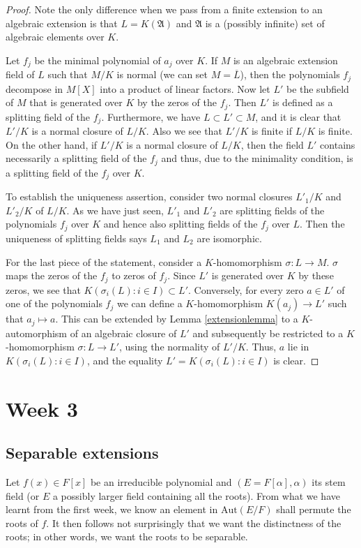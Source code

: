 \documentclass[12pt]{report}
\theoremstyle{definition}
\def\AA{\mathfrak{A}}
\def\Aut{\text{Aut}}
\def\aa{\alpha}
\begin{document}
\begin{proof} 
    Note the only difference when we pass from a finite extension to an algebraic extension is that $L=K(\AA)$ and $\AA$ is a (possibly infinite) set of algebraic elements over $K$.
    
    Let $f_j$ be the minimal polynomial of $a_j$ over $K$. If $M$ is an algebraic extension field of $L$ such that $M/K$ is normal (we can set $M=\overline{L}$), then the polynomials $f_j$ decompose in $M[X]$ into a product of linear factors. Now let $L'$ be the subfield of $M$ that is generated over $K$ by the zeros of the $f_j$. Then $L'$ is defined as a splitting field of the $f_j$. Furthermore, we have $L \subset L' \subset M$, and it is clear that $L'/K$ is a normal closure of $L/K$. Also we see that $L'/K$ is finite if $L/K$ is finite. On the other hand, if $L'/K$ is a normal closure of $L/K$, then the field $L'$ contains necessarily a splitting field of the $f_j$ and thus, due to the minimality condition, is a splitting field of the $f_j$ over $K$.


    To establish the uniqueness assertion, consider two normal closures $L'_1/K$ and $L'_2/K$ of $L/K$. As we have just seen, $L'_1$ and $L'_2$ are splitting fields of the polynomials $f_j$ over $K$ and hence also splitting fields of the $f_j$ over $L$. Then the uniqueness of splitting fields says $L_1$ and $L_2$ are isomorphic.


    For the last piece of the statement, consider a $K$-homomorphism $\sigma : L \to M$. $\sigma$ maps the zeros of the $f_j$ to zeros of $f_j$. Since $L'$ is generated over $K$ by these zeros, we see that $K(\sigma_i(L): i \in I) \subset L'$. Conversely, for every zero $a \in L'$ of one of the polynomials $f_j$ we can define a $K$-homomorphism $K(a_j) \to L'$ such that $a_j \mapsto a$. This can be extended by Lemma \ref{extensionlemma} to a $K$-automorphism of an algebraic closure of $L'$ and subsequently be restricted to a $K$-homomorphism $\sigma : L \to L'$, using the normality of $L'/K$. Thus, $a$ lie in $K(\sigma_i(L): i \in I)$, and the equality $L' = K(\sigma_i(L): i \in I)$ is clear.
\end{proof}

\chapter*{Week 3}
\setcounter{chapter}{3}

\section{Separable extensions}
Let $f(x)\in F[x]$ be an irreducible polynomial and $(E=F[\aa],\aa)$ its stem field (or $E$ a possibly larger field containing all the roots). From what we have learnt from the first week, we know an element in $\Aut(E/F)$ shall permute the roots of $f$. It then follows not surprisingly that we want the distinctness of the roots; in other words, we want the roots to be separable.
\end{document}
